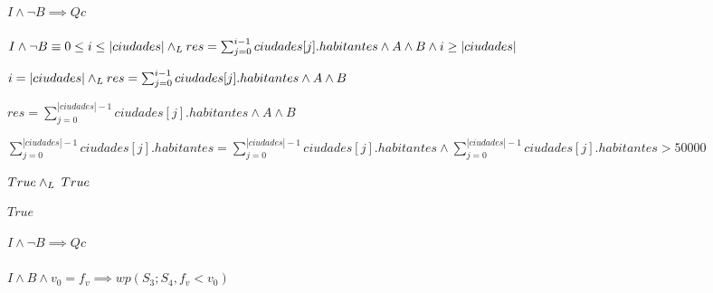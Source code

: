 \documentclass[10pt,a4paper]{article}
\begin{document}
\paragraph{$I \wedge \neg B \implies Qc$}
$I \wedge \neg B \equiv 0 \leq i \leq |ciudades| \land _L res = \sum_{j=0}^{i-1} ciudades[j].habitantes \wedge A \wedge B \wedge i \geq |ciudades| $ \equiv \par

\begin{center}
  $i = |ciudades| \land _L res = \sum_{j=0}^{i-1} ciudades[j].habitantes \wedge A \wedge B$ \equiv \par
\vspace{5px}  
$res = \sum_{j=0}^{|ciudades|-1} ciudades[j].habitantes \wedge A \wedge B$ \implies \par
\vspace{5px} 
$\sum_{j=0}^{|ciudades|-1} ciudades[j].habitantes = \sum_{j=0}^{|ciudades|-1} ciudades[j].habitantes \wedge \sum_{j=0}^{|ciudades|-1} ciudades[j].habitantes > 50000$  \par
\vspace{5px}
\equiv \; $True \land _L \; True$ \equiv \par
\vspace{5px}
$True$\par
\vspace{5px}
$I \wedge \neg B \implies Qc$
\end{center}

\paragraph{$I \wedge  B \wedge v_{0}=f_{v} \implies wp(S_{3};S_{4}, f_{v} < v_{0})$}
\end{document}
